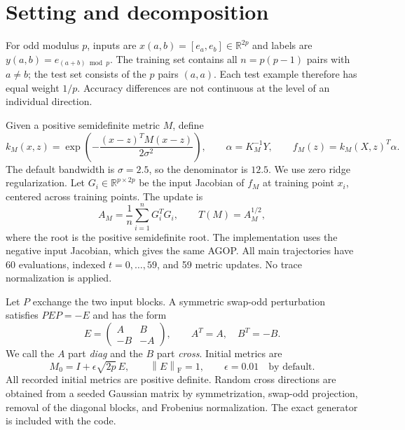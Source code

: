 \documentclass[11pt]{article}
\newcommand{\R}{\mathbb R}
\newcommand{\norm}[1]{\left\lVert#1\right\rVert}
\newcommand{\Frob}{\mathrm F}
\begin{document}
\section{Setting and decomposition}\label{sec:setting}
For odd modulus $p$, inputs are $x(a,b)=[e_a,e_b]\in\R^{2p}$ and labels are $y(a,b)=e_{(a+b)\bmod p}$. The training set contains all $n=p(p-1)$ pairs with $a\ne b$; the test set consists of the $p$ pairs $(a,a)$. Each test example therefore has equal weight $1/p$. Accuracy differences are not continuous at the level of an individual direction.

Given a positive semidefinite metric $M$, define
\begin{equation}
 k_M(x,z)=\exp\!\left(-\frac{(x-z)^TM(x-z)}{2\sigma^2}\right),\qquad
 \alpha=K_M^{-1}Y,\qquad f_M(z)=k_M(X,z)^T\alpha .\label{eq:kernel}
\end{equation}
The default bandwidth is $\sigma=2.5$, so the denominator is $12.5$. We use zero ridge regularization. Let $G_i\in\R^{p\times 2p}$ be the input Jacobian of $f_M$ at training point $x_i$, centered across training points. The update is
\begin{equation}
 A_M=\frac1n\sum_{i=1}^n G_i^TG_i,\qquad T(M)=A_M^{1/2},\label{eq:update}
\end{equation}
where the root is the positive semidefinite root. The implementation uses the negative input Jacobian, which gives the same AGOP. All main trajectories have 60 evaluations, indexed $t=0,\ldots,59$, and 59 metric updates. No trace normalization is applied.

Let $P$ exchange the two input blocks. A symmetric swap-odd perturbation satisfies $PEP=-E$ and has the form
\begin{equation}
 E=\begin{pmatrix}A&B\\-B&-A\end{pmatrix},\qquad A^T=A,\quad B^T=-B.
\end{equation}
We call the $A$ part \emph{diag} and the $B$ part \emph{cross}. Initial metrics are
\begin{equation}
 M_0=I+\epsilon\sqrt{2p}\,E,\qquad \norm{E}_{\Frob}=1,\qquad \epsilon=0.01\quad\text{by default}.\label{eq:init}
\end{equation}
All recorded initial metrics are positive definite. Random cross directions are obtained from a seeded Gaussian matrix by symmetrization, swap-odd projection, removal of the diagonal blocks, and Frobenius normalization. The exact generator is included with the code.
\end{document}
